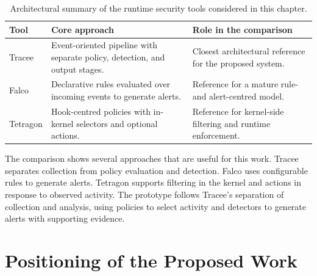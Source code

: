 \begin{table}[H]
    \centering
    \small
    \renewcommand{\arraystretch}{1.25}

    \begin{tabularx}{\textwidth}{
        >{\raggedright\arraybackslash}p{}
        >{\raggedright\arraybackslash}X
        >{\raggedright\arraybackslash}X
    }
        \toprule
        \textbf{Tool} &
        \textbf{Core approach} &
        \textbf{Role in the comparison} \\
        \midrule

        Tracee &
        Event-oriented pipeline with separate policy, detection, and output
        stages. &
        Closest architectural reference for the proposed system.
        \cite{aquasecurity_tracee_policies,
        aquasecurity_tracee_detectors} \\

        Falco &
        Declarative rules evaluated over incoming events to generate alerts. &
        Reference for a mature rule- and alert-centred model.
        \cite{falcosecurity_falco_rules,
        falcosecurity_falco_rule_conditions} \\

        Tetragon &
        Hook-centred policies with in-kernel selectors and optional actions. &
        Reference for kernel-side filtering and runtime enforcement.
        \cite{cilium_tetragon_tracing_policy,
        cilium_tetragon_enforcement} \\

        \bottomrule
    \end{tabularx}

    \caption{Architectural summary of the runtime security tools considered in
    this chapter.}
    \label{tab:runtime-security-tools-comparison}
\end{table}

The comparison shows several approaches that are useful for this work.
Tracee separates collection from policy evaluation and detection.
Falco uses configurable rules to generate alerts.
Tetragon supports filtering in the kernel and actions in response to
observed activity. The prototype follows Tracee's separation of collection
and analysis, using policies to select activity and detectors to generate
alerts with supporting evidence.

\section{Positioning of the Proposed Work}
\label{sec:positioning-proposed-work}

